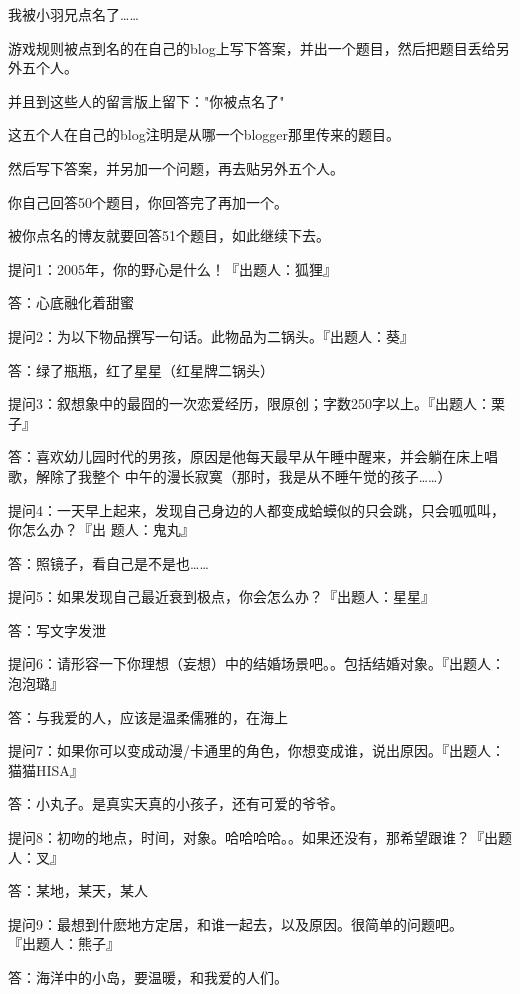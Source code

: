 \documentclass[12pt,a4paper]{article}
\def\blankrev{\vspace{1ex}}									%
\begin{document}

		我被小羽兄点名了……

		游戏规则被点到名的在自己的blog上写下答案，并出一个题目，然后把题目丢给另外五个人。\par
		并且到这些人的留言版上留下："你被点名了"\par
		这五个人在自己的blog注明是从哪一个blogger那里传来的题目。\par
		然后写下答案，并另加一个问题，再去贴另外五个人。\par
		你自己回答50个题目，你回答完了再加一个。\par
		被你点名的博友就要回答51个题目，如此继续下去。


		提问1：2005年，你的野心是什么！『出题人：狐狸』\par
		答：心底融化着甜蜜

		\blankrev
		提问2：为以下物品撰写一句话。此物品为二锅头。『出题人：葵』\par
		答：绿了瓶瓶，红了星星（红星牌二锅头）

		\blankrev
		提问3：叙想象中的最囧的一次恋爱经历，限原创；字数250字以上。『出题人：栗子』\par
		答：喜欢幼儿园时代的男孩，原因是他每天最早从午睡中醒来，并会躺在床上唱歌，解除了我整个
			中午的漫长寂寞（那时，我是从不睡午觉的孩子……）

		\blankrev
		提问4：一天早上起来，发现自己身边的人都变成蛤蟆似的只会跳，只会呱呱叫，你怎么办？『出
				题人：鬼丸』\par
		答：照镜子，看自己是不是也……

		\blankrev
		提问5：如果发现自己最近衰到极点，你会怎么办？『出题人：星星』\par
		答：写文字发泄

		\blankrev
		提问6：请形容一下你理想（妄想）中的结婚场景吧。。包括结婚对象。『出题人：泡泡璐』\par
		答：与我爱的人，应该是温柔儒雅的，在海上

		\blankrev
		提问7：如果你可以变成动漫/卡通里的角色，你想变成谁，说出原因。『出题人：猫猫HISA』\par
		答：小丸子。是真实天真的小孩子，还有可爱的爷爷。

		\blankrev
		提问8：初吻的地点，时间，对象。哈哈哈哈。。如果还没有，那希望跟谁？『出题人：叉』\par
		答：某地，某天，某人

		\blankrev
		提问9：最想到什麽地方定居，和谁一起去，以及原因。很简单的问题吧。\\『出题人：熊子』\par
		答：海洋中的小岛，要温暖，和我爱的人们。
\end{document}
